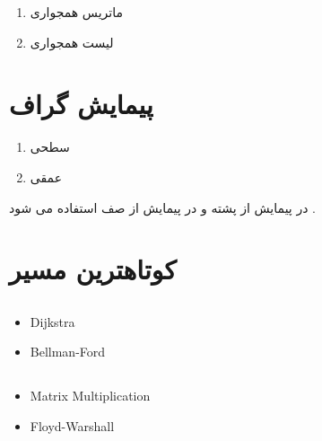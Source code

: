 \documentclass[12pt]{book}
\begin{document}
\begin{enumerate}
	\item ماتریس همجواری
	\item لیست همجواری
\end{enumerate}



\section{پیمایش گراف}


\begin{enumerate}
	\item سطحی
	\item عمقی
\end{enumerate}

در پیمایش
از پشته و در پیمایش
از صف استفاده می شود .






\section{کوتاهترین مسیر
}



\subsection{}

\begin{latin}
\begin{itemize}
	\item Dijkstra
	\item Bellman-Ford
\end{itemize}
\end{latin}


\subsection{}

\begin{latin}
\begin{itemize}
	\item Matrix Multiplication
	\item Floyd-Warshall
\end{itemize}
\end{latin}
\end{document}
